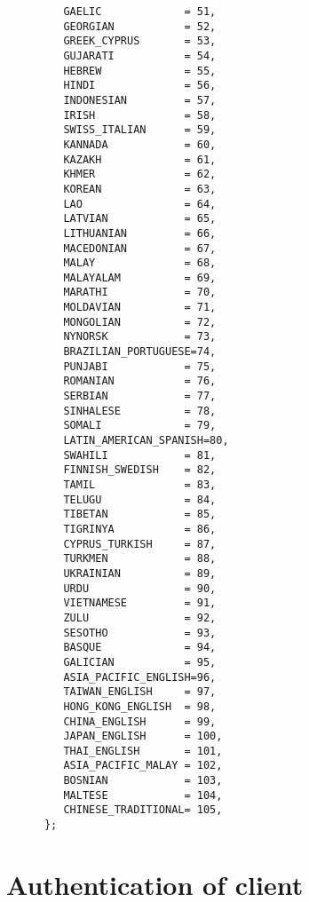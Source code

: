 \begin{verbatim}
         GAELIC             = 51,
         GEORGIAN           = 52,
         GREEK_CYPRUS       = 53,
         GUJARATI           = 54,
         HEBREW             = 55,
         HINDI              = 56,
         INDONESIAN         = 57,
         IRISH              = 58,
         SWISS_ITALIAN      = 59,
         KANNADA            = 60,
         KAZAKH             = 61,
         KHMER              = 62,
         KOREAN             = 63,
         LAO                = 64,
         LATVIAN            = 65,
         LITHUANIAN         = 66,
         MACEDONIAN         = 67,
         MALAY              = 68,
         MALAYALAM          = 69,
         MARATHI            = 70,
         MOLDAVIAN          = 71,
         MONGOLIAN          = 72,
         NYNORSK            = 73,
         BRAZILIAN_PORTUGUESE=74,
         PUNJABI            = 75,
         ROMANIAN           = 76,
         SERBIAN            = 77,
         SINHALESE          = 78,
         SOMALI             = 79,
         LATIN_AMERICAN_SPANISH=80,
         SWAHILI            = 81,
         FINNISH_SWEDISH    = 82,
         TAMIL              = 83,
         TELUGU             = 84,
         TIBETAN            = 85,
         TIGRINYA           = 86,
         CYPRUS_TURKISH     = 87,
         TURKMEN            = 88,
         UKRAINIAN          = 89,
         URDU               = 90,
         VIETNAMESE         = 91,
         ZULU               = 92,
         SESOTHO            = 93,
         BASQUE             = 94,
         GALICIAN           = 95,
         ASIA_PACIFIC_ENGLISH=96,
         TAIWAN_ENGLISH     = 97,
         HONG_KONG_ENGLISH  = 98,
         CHINA_ENGLISH      = 99,
         JAPAN_ENGLISH      = 100,
         THAI_ENGLISH       = 101,
         ASIA_PACIFIC_MALAY = 102,
         BOSNIAN            = 103,
         MALTESE            = 104,
         CHINESE_TRADITIONAL= 105,
      };
\end{verbatim}

\section{Authentication of client}
\label{Authentication of client}

